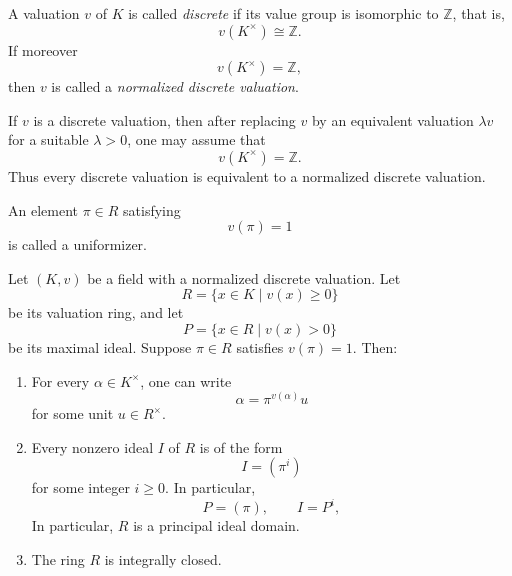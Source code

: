 \begin{definition}
A valuation \(v\) of \(K\) is called \emph{discrete} if its value group is isomorphic to
\(\mathbb{Z}\), that is,
\[
    v(K^\times)\cong \mathbb{Z}.
\]
If moreover
\[
    v(K^\times)=\mathbb{Z},
\]
then \(v\) is called a \emph{normalized discrete valuation}.
\end{definition}

\begin{remark}
If \(v\) is a discrete valuation, then after replacing \(v\) by an equivalent valuation
\(\lambda v\) for a suitable \(\lambda>0\), one may assume that
\[
    v(K^\times)=\mathbb{Z}.
\]
Thus every discrete valuation is equivalent to a normalized discrete valuation.
\end{remark}

\begin{definition} 
    An element \(\pi\in R\) satisfying
    \[
        v(\pi)=1
    \]
    is called a uniformizer.
\end{definition}

\begin{theorem}
    Let \((K,v)\) be a field with a normalized discrete valuation. Let
    \[
        R=\{x\in K\mid v(x)\geq 0\}
    \]
    be its valuation ring, and let
    \[
        P=\{x\in R\mid v(x)>0\}
    \]
    be its maximal ideal. Suppose \(\pi\in R\) satisfies \(v(\pi)=1\). Then:
    \begin{enumerate}
        \item For every \(\alpha\in K^\times\), one can write
              \[
                  \alpha=\pi^{v(\alpha)}u
              \]
              for some unit \(u\in R^\times\).

        \item Every nonzero ideal \(I\) of \(R\) is of the form
              \[
                  I=(\pi^i)
              \]
              for some integer \(i\geq 0\). In particular,
              \[
                  P=(\pi),
                  \qquad
                  I=P^i,
              \]
              In particular, \(R\) is a principal ideal domain.

        \item The ring \(R\) is integrally closed.
    \end{enumerate}
\end{theorem}

